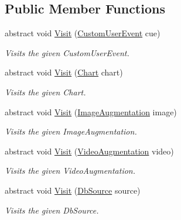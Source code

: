\subsection*{Public Member Functions}
\begin{DoxyCompactItemize}
\item 
abstract void \hyperlink{class_a_rdev_kit_1_1_controller_1_1_project_controller_1_1_abstract_project_visitor_aafdd79d5f00d223cb7a5269344b55e8d}{Visit} (\hyperlink{class_a_rdev_kit_1_1_model_1_1_project_1_1_custom_user_event}{Custom\-User\-Event} cue)
\begin{DoxyCompactList}\small\item\em Visits the given Custom\-User\-Event. \end{DoxyCompactList}\item 
abstract void \hyperlink{class_a_rdev_kit_1_1_controller_1_1_project_controller_1_1_abstract_project_visitor_afc567731ac7e98ef86c2d26c5f22b4d8}{Visit} (\hyperlink{class_a_rdev_kit_1_1_model_1_1_project_1_1_chart}{Chart} chart)
\begin{DoxyCompactList}\small\item\em Visits the given Chart. \end{DoxyCompactList}\item 
abstract void \hyperlink{class_a_rdev_kit_1_1_controller_1_1_project_controller_1_1_abstract_project_visitor_a9f0a4ed7ac360a201255c1ed37759bee}{Visit} (\hyperlink{class_a_rdev_kit_1_1_model_1_1_project_1_1_image_augmentation}{Image\-Augmentation} image)
\begin{DoxyCompactList}\small\item\em Visits the given Image\-Augmentation. \end{DoxyCompactList}\item 
abstract void \hyperlink{class_a_rdev_kit_1_1_controller_1_1_project_controller_1_1_abstract_project_visitor_afd227a5cdb38cbfe2bb88ca22a5adf56}{Visit} (\hyperlink{class_a_rdev_kit_1_1_model_1_1_project_1_1_video_augmentation}{Video\-Augmentation} video)
\begin{DoxyCompactList}\small\item\em Visits the given Video\-Augmentation. \end{DoxyCompactList}\item 
abstract void \hyperlink{class_a_rdev_kit_1_1_controller_1_1_project_controller_1_1_abstract_project_visitor_ae89191e9e36e1de0ca8b2a68aa20c13f}{Visit} (\hyperlink{class_a_rdev_kit_1_1_model_1_1_project_1_1_db_source}{Db\-Source} source)
\begin{DoxyCompactList}\small\item\em Visits the given Db\-Source. \end{DoxyCompactList}\item 

\end{DoxyCompactItemize}
